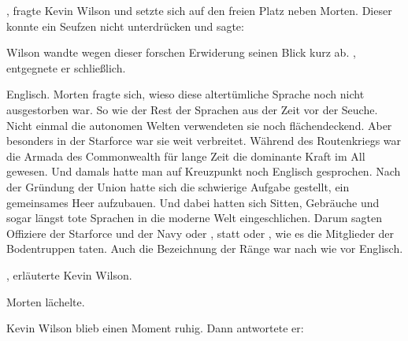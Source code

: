 , fragte Kevin Wilson und setzte sich auf den freien Platz neben Morten. Dieser konnte ein Seufzen nicht unterdrücken und sagte: 

\par

Wilson wandte wegen dieser forschen Erwiderung seinen Blick kurz ab. , entgegnete er schließlich. 

\par

Englisch. Morten fragte sich, wieso diese altertümliche Sprache noch nicht ausgestorben war. So wie der Rest der Sprachen aus der Zeit vor der Seuche. Nicht einmal die autonomen Welten verwendeten sie noch flächendeckend. Aber besonders in der Starforce war sie weit verbreitet. Während des Routenkriegs war die Armada des Commonwealth für lange Zeit die dominante Kraft im All gewesen. Und damals hatte man auf Kreuzpunkt noch Englisch gesprochen. Nach der Gründung der Union hatte sich die schwierige Aufgabe gestellt, ein gemeinsames Heer aufzubauen. Und dabei hatten sich Sitten, Gebräuche und sogar längst tote Sprachen in die moderne Welt eingeschlichen. Darum sagten Offiziere der Starforce und der Navy  oder , statt  oder , wie es die Mitglieder der Bodentruppen taten. Auch die Bezeichnung der Ränge war nach wie vor Englisch.

\par

, erläuterte Kevin Wilson. 

\par

Morten lächelte. 

\par

Kevin Wilson blieb einen Moment ruhig. Dann antwortete er: 


